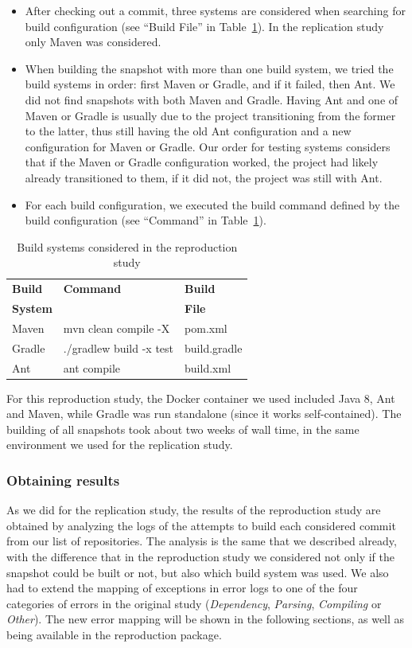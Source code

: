 \begin{itemize}
\item After checking out a commit, three systems are considered when searching for build configuration (see ``Build File'' in Table~\ref{table:buildSystems}). In the replication study only Maven was considered.
\item When building the snapshot with more than one build system, we tried the build systems in order: first Maven or Gradle, and if it failed, then Ant. We did not find snapshots with both Maven and Gradle. Having Ant and one of Maven or Gradle is usually due to the project transitioning from the former to the latter, thus still having the old Ant configuration and a new configuration for Maven or Gradle. Our order for testing systems considers that if the Maven or Gradle configuration worked, the project had likely already transitioned to them, if it did not, the project was still with Ant.
\item For each build configuration, we executed the build command defined by the build configuration (see ``Command'' in Table~\ref{table:buildSystems}).
\end{itemize}

\begin{table}[h]
  \caption{Build systems considered in the reproduction study}
  \label{table:buildSystems}
  \centering
  \begin{tabular}{lll}
    \toprule
    \bf{Build } & \bf{Command} & \bf{Build}\\
    \bf{System} &              & \bf{File }\\ 
    \midrule
    Maven & mvn clean compile -X & pom.xml\\
    Gradle & ./gradlew build -x test & build.gradle \\
    Ant & ant compile  & build.xml \\
    \midrule
  \end{tabular}
\end{table}
 
For this reproduction study, the Docker container we used included Java 8, Ant and Maven, while Gradle was run standalone (since it works self-contained). 
The building of all snapshots took about two weeks of wall time, in the same environment we used for the replication study.


\subsubsection{Obtaining results}

As we did for the replication study, the results of the reproduction study are obtained by analyzing the logs of the attempts to build each considered commit from our list of repositories. The analysis is the same that we described already, with the difference that in the reproduction study we considered not only if the snapshot could be built or not, but also which build system was used. We also had to extend the mapping of exceptions in error logs to one of the four categories of errors in the original study (\textit{Dependency}, \textit{Parsing}, \textit{Compiling} or \textit{Other}). 
The new error mapping will be shown in the following sections, as well as being available in the reproduction package.
